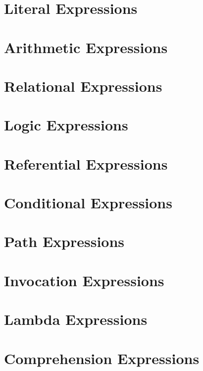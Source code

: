 \documentclass[a4paper,oneside,12pt, extrafontsizes]{memoir}
\begin{document}
\chapter{Literal Expressions}
\label{ch:literals}


\chapter{Arithmetic Expressions}
\label{ch:arithmetic}


\chapter{Relational Expressions}
\label{ch:relational}


\chapter{Logic Expressions}
\label{ch:logic}


\chapter{Referential Expressions}
\label{ch:referential}


\chapter{Conditional Expressions}
\label{ch:conditionals}


\chapter{Path Expressions}
\label{ch:paths}


\chapter{Invocation Expressions}
\label{ch:invocations}


\chapter{Lambda Expressions}
\label{ch:lambdas}


\chapter{Comprehension Expressions}
\label{ch:comprehensions}

\end{document}
